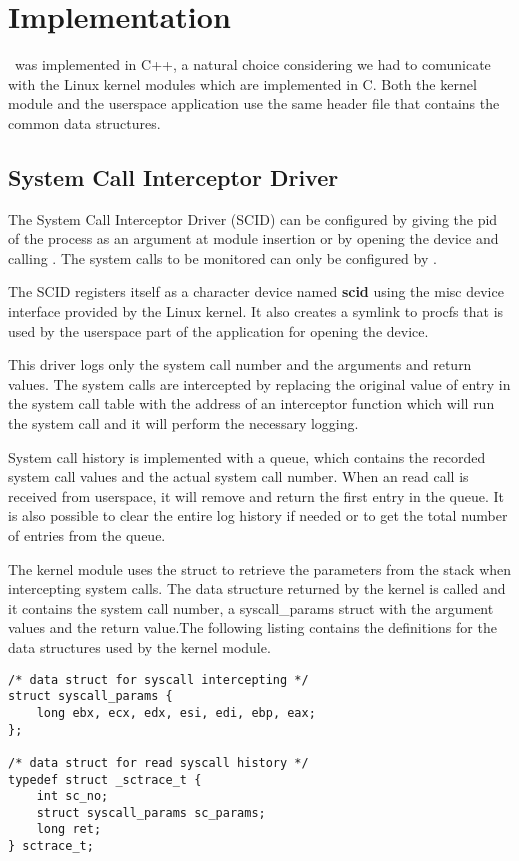 \chapter{Implementation}
\label{chapter:fourth-chapter}

\project\ was implemented in C++, a natural choice considering we had to comunicate with the Linux kernel modules which are implemented in C. Both the kernel module and the userspace application use the same header file that contains the common data structures.

\section{System Call Interceptor Driver}
\label{fourth:scid}

The System Call Interceptor Driver (SCID) can be configured by giving the pid of the process as an argument at module insertion or by opening the device and calling . The system calls to be monitored can only be configured by .

The SCID registers itself as a character device named \textbf{scid} using the misc device interface provided by the Linux kernel. It also creates a symlink to procfs that is used by the userspace part of the application for opening the device.

This driver logs only the system call number and the arguments and return values. The system calls are intercepted by replacing the original value of entry in the system call table with the address of an interceptor function which will run the system call and it will perform the necessary logging.

System call history is implemented with a queue, which contains the recorded system call values and the actual system call number. When an  read call is received from userspace, it will remove and return the first entry in the queue. It is also possible to clear the entire log history if needed or to get the total number of entries from the queue.

The kernel module uses the  struct to retrieve the parameters from the stack when intercepting system calls. The data structure returned by the kernel is called  and it contains the system call number, a syscall_params struct with the argument values and the return value.The following listing contains the definitions for the data structures used by the kernel module.

\lstset{language=C,caption=SCID data structures,label=lst:scid-struct}
\begin{lstlisting}
/* data struct for syscall intercepting */
struct syscall_params {
	long ebx, ecx, edx, esi, edi, ebp, eax;
};

/* data struct for read syscall history */
typedef struct _sctrace_t {
	int sc_no;
	struct syscall_params sc_params;
	long ret;
} sctrace_t;
\end{lstlisting}

